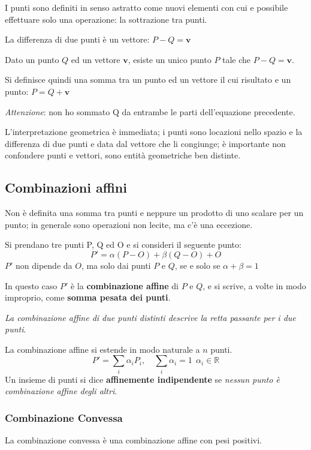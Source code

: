 \documentclass[a4paper, 10pt]{article}
\renewcommand{\vec}{\bm}
\newcommand{\numberset}{\mathbb}
\newcommand{\R}{\numberset{R}}
\begin{document}
			\noindent
			I punti sono definiti in senso astratto come nuovi elementi con
			cui e possibile effettuare solo una operazione: la sottrazione
			tra punti.
			
			
			La differenza di due punti è un vettore: $ P - Q = \vec{v} $
			
			Dato un punto $ Q $ ed un vettore $ \vec{v} $, esiste un unico punto $ P $
			tale che $ P - Q = \vec{v} $.
			
			Si definisce quindi una somma tra un punto ed un vettore il
			cui risultato e un punto: $ P = Q + \vec{v} $
			
			\noindent
			\textit{Attenzione}: non ho sommato Q da entrambe le parti
			dell'equazione precedente.
			
			\noindent
			L'interpretazione geometrica è immediata; i punti sono
			locazioni nello spazio e la differenza di due punti e data dal
			vettore che li congiunge; è importante non confondere punti e
			vettori, sono entità geometriche ben distinte.
			
		\subsection{Combinazioni affini}
			Non è definita una somma tra punti e neppure un prodotto di
			uno scalare per un punto; in generale sono operazioni non
			lecite, ma c'è una eccezione.
			
			\noindent
			Si prendano tre punti P, Q ed O e si consideri il seguente
			punto: 
			\[
				P' = \alpha(P - O) + \beta(Q - O) + O 
			\]
			$ P' $ non dipende da $ O $, ma solo dai punti $ P $ e $ Q $, se e solo se $ \alpha + \beta = 1 $
			
			\noindent
			In questo caso $ P' $ è la \textbf{combinazione affine} di $ P $ e $ Q $, e si scrive,
			a volte in modo improprio, come \textbf{somma pesata dei punti}.
			
			\noindent
			\textit{La combinazione affine di due punti distinti descrive la retta
			passante per i due punti}.

			\noindent
			La combinazione affine si estende in modo naturale a $ n $ punti.
			\[
				P' = \sum_{i} \alpha_i P_i , \quad \sum_{i} \alpha_i = 1 \: \: \alpha_i \in \R
			\]
			Un insieme di punti si dice \textbf{affinemente indipendente} se
			\textit{nessun punto è combinazione affine degli altri}.
			
		\subsubsection{Combinazione Convessa}
			La combinazione convessa è una combinazione affine con pesi
			positivi.
			
\end{document}
